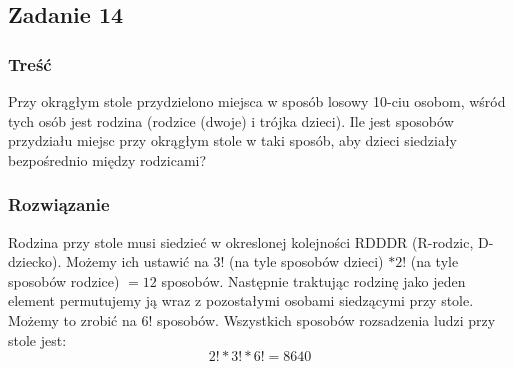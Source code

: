\subsection{Zadanie 14}

\subsubsection*{Treść}
Przy okrągłym stole przydzielono miejsca w sposób losowy 10-ciu osobom, wśród tych osób jest rodzina (rodzice (dwoje) i trójka dzieci). Ile jest sposobów przydziału miejsc przy okrągłym stole w taki sposób, aby dzieci siedziały bezpośrednio między rodzicami?


\subsubsection*{Rozwiązanie}
Rodzina przy stole musi siedzieć w okreslonej kolejności RDDDR (R-rodzic, D-dziecko).
Możemy ich ustawić na $3!$ (na tyle sposobów dzieci) $* 2!$ (na tyle sposobów rodzice)  $= 12$ sposobów. 
Następnie traktując rodzinę jako jeden element permutujemy ją wraz z pozostałymi osobami siedzącymi przy
stole. Możemy to zrobić na $6!$ sposobów. Wszystkich sposobów rozsadzenia ludzi przy stole jest:
$$
2! * 3! * 6! = 8 640
$$

